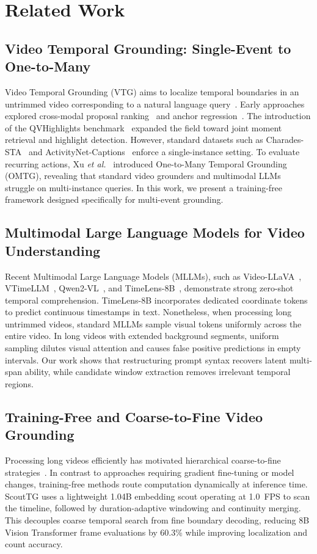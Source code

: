 \section{Related Work}
\label{sec:related_work}

\subsection{Video Temporal Grounding: Single-Event to One-to-Many}
Video Temporal Grounding (VTG) aims to localize temporal boundaries in an untrimmed video corresponding to a natural language query~\cite{gao2017tall,anne2017localizing}. Early approaches explored cross-modal proposal ranking~\cite{gao2017tall} and anchor regression~\cite{lei2021momentdetr}. The introduction of the QVHighlights benchmark~\cite{lei2021qvhighlights} expanded the field toward joint moment retrieval and highlight detection. However, standard datasets such as Charades-STA~\cite{gao2017tall} and ActivityNet-Captions~\cite{anne2017localizing} enforce a single-instance setting. To evaluate recurring actions, Xu \emph{et al.}~\cite{omtg2026} introduced One-to-Many Temporal Grounding (OMTG), revealing that standard video grounders and multimodal LLMs struggle on multi-instance queries. In this work, we present a training-free framework designed specifically for multi-event grounding.

\subsection{Multimodal Large Language Models for Video Understanding}
Recent Multimodal Large Language Models (MLLMs), such as Video-LLaVA~\cite{lin2023videollava}, VTimeLLM~\cite{li2023vtimellm}, Qwen2-VL~\cite{bai2024qwen2vl}, and TimeLens-8B~\cite{timelens2024}, demonstrate strong zero-shot temporal comprehension. TimeLens-8B incorporates dedicated coordinate tokens to predict continuous timestamps in text. Nonetheless, when processing long untrimmed videos, standard MLLMs sample visual tokens uniformly across the entire video. In long videos with extended background segments, uniform sampling dilutes visual attention and causes false positive predictions in empty intervals. Our work shows that restructuring prompt syntax recovers latent multi-span ability, while candidate window extraction removes irrelevant temporal regions.

\subsection{Training-Free and Coarse-to-Fine Video Grounding}
Processing long videos efficiently has motivated hierarchical coarse-to-fine strategies~\cite{lei2021momentdetr,lin2023unitime}. In contrast to approaches requiring gradient fine-tuning or model changes, training-free methods route computation dynamically at inference time. ScoutTG uses a lightweight 1.04B embedding scout operating at 1.0~FPS to scan the timeline, followed by duration-adaptive windowing and continuity merging. This decouples coarse temporal search from fine boundary decoding, reducing 8B Vision Transformer frame evaluations by 60.3\% while improving localization and count accuracy.
